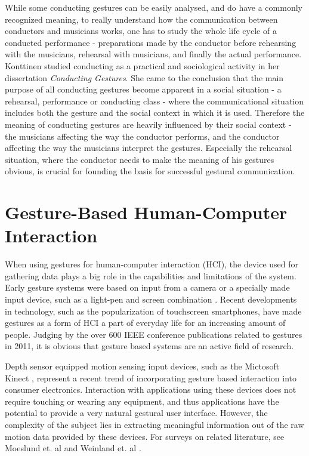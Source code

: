 While some conducting gestures can be easily analysed,
and do have a commonly recognized meaning,
to really understand how the communication between
conductors and musicians works,
one has to study the whole life cycle of a conducted performance -
preparations made by the conductor before rehearsing with the musicians,
rehearsal with musicians,
and finally the actual performance.
Konttinen \cite{konttinen2008} studied
conducting as a practical and sociological activity
in her dissertation \textit{Conducting Gestures}.
She came to the conclusion that the main purpose of all
conducting gestures become apparent in a social situation -
a rehearsal, performance or conducting class -
where the communicational situation includes both the gesture
and the social context in which it is used.
Therefore the meaning of conducting gestures are
heavily influenced by their social context -
the musicians affecting the way the conductor performs,
and the conductor affecting the way the musicians interpret the gestures.
Especially the rehearsal situation,
where the conductor needs to make the meaning of his gestures obvious,
is crucial for founding the basis for successful gestural communication.

\section{Gesture-Based Human-Computer Interaction}

When using gestures for human-computer interaction (HCI),
the device used for gathering data plays a big role
in the capabilities and limitations of the system.
Early gesture systems were based on input from
a camera or a specially made input device,
such as a light-pen and screen combination \cite{turk2002}.
Recent developments in technology,
such as the popularization of touchscreen smartphones,
have made gestures as a form of HCI
a part of everyday life for an increasing amount of people.
Judging by the over 600 IEEE conference publications related to gestures in 2011,
it is obvious that gesture based systems are an active field of research.

Depth sensor equipped motion sensing input devices,
such as the Mictosoft Kinect \cite{kinect_overview},
represent a recent trend of incorporating gesture based interaction
into consumer electronics.
Interaction with applications using these devices
does not require touching or wearing any equipment,
and thus applications have the potential to provide
a very natural gestural user interface.
However, the complexity of the subject lies in extracting
meaningful information out of the raw motion data provided by these devices.
For surveys on related literature,
see Moeslund et. al \cite{Moeslund2006} and Weinland et. al \cite{Weinland2011}.

